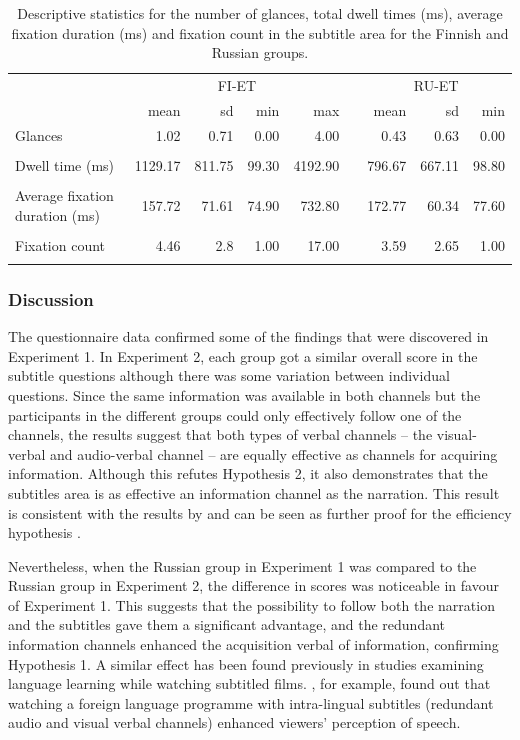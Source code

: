 \documentclass[output=paper]{langsci/langscibook}
\begin{document}
\begin{table}
\small
\begin{tabularx}{\textwidth}{Xrrrrcrrr} 
\lsptoprule
& \multicolumn{4}{c}{ FI-ET} && \multicolumn{3}{c}{ RU-ET}\\
				& mean & sd & min & max && mean & sd & min\\
\midrule
{ Glances} 			& 1.02 	  & 0.71   & 0.00 & 4.00     && 0.43   & 0.63   & 0.00\\ \\
{ Dwell time (ms)} 		& 1129.17 & 811.75 & 99.30 & 4192.90 && 796.67 & 667.11 & 98.80\\ \\
{ Average \newline fixation duration (ms)}	& 157.72  & 71.61  & 74.90 & 732.80  && 172.77 & 60.34  & 77.60\\ \\
{ Fixation count} 		& 4.46    & 2.8    & 1.00  & 17.00   && 3.59   & 2.65   & 1.00\\  
\lspbottomrule
\end{tabularx}
\caption{Descriptive statistics for the number of glances, total dwell times (ms), average fixation duration (ms) and fixation count in the subtitle area for the Finnish and Russian groups.}
\label{lang:tab:1}
\end{table}

\subsubsection{Discussion}

The questionnaire data confirmed some of the findings that were discovered in Experiment 1. In Experiment 2, each group got a similar overall score in the subtitle questions although there was some variation between individual questions. Since the same information was available in both channels but the participants in the different groups could only effectively follow one of the channels, the results suggest that both types of verbal channels -- the visual-verbal and audio-verbal channel -- are equally effective as channels for acquiring information. Although this refutes Hypothesis 2, it also demonstrates that the subtitles area is as effective an information channel as the narration. This result is consistent with the results by \citet{Perego2010} and can be seen as further proof for the efficiency hypothesis \citep{dydewalle1987}. 
 
\newpage 
Nevertheless, when the Russian group in Experiment 1 was compared to the Russian group in Experiment 2, the difference in scores was noticeable in favour of Experiment 1. This suggests that the possibility to follow both the narration and the subtitles gave them a significant advantage, and the redundant information channels enhanced the acquisition verbal of information, confirming Hypothesis 1. A similar effect has been found previously in studies examining language learning while watching subtitled films. \citet{mitterer2009}, for example, found out that watching a foreign language programme with intra-lingual subtitles (redundant audio and visual verbal channels) enhanced viewers' perception of speech. 
\end{document}
